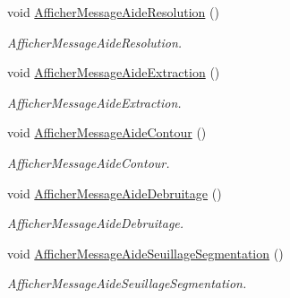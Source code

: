 \begin{DoxyCompactItemize}
\mbox{\label{classMainWindow_a739230f160f977f84bbd1aa6b8b3bed6}} 
void \hyperlink{classMainWindow_a739230f160f977f84bbd1aa6b8b3bed6}{Afficher\+Message\+Aide\+Resolution} ()
\begin{DoxyCompactList}\small\item\em Afficher\+Message\+Aide\+Resolution. \end{DoxyCompactList}\item 
\mbox{\label{classMainWindow_a0686a5e005ce5ad4c4bea3a6224b552d}} 
void \hyperlink{classMainWindow_a0686a5e005ce5ad4c4bea3a6224b552d}{Afficher\+Message\+Aide\+Extraction} ()
\begin{DoxyCompactList}\small\item\em Afficher\+Message\+Aide\+Extraction. \end{DoxyCompactList}\item 
\mbox{\label{classMainWindow_ac243627f25330122f272623cc1e87736}} 
void \hyperlink{classMainWindow_ac243627f25330122f272623cc1e87736}{Afficher\+Message\+Aide\+Contour} ()
\begin{DoxyCompactList}\small\item\em Afficher\+Message\+Aide\+Contour. \end{DoxyCompactList}\item 
\mbox{\label{classMainWindow_ab3fd048b197f1854d173268ec4de9741}} 
void \hyperlink{classMainWindow_ab3fd048b197f1854d173268ec4de9741}{Afficher\+Message\+Aide\+Debruitage} ()
\begin{DoxyCompactList}\small\item\em Afficher\+Message\+Aide\+Debruitage. \end{DoxyCompactList}\item 
\mbox{\label{classMainWindow_aae084a3e268d6651c65cebda3dae97ff}} 
void \hyperlink{classMainWindow_aae084a3e268d6651c65cebda3dae97ff}{Afficher\+Message\+Aide\+Seuillage\+Segmentation} ()
\begin{DoxyCompactList}\small\item\em Afficher\+Message\+Aide\+Seuillage\+Segmentation. \end{DoxyCompactList}\item 
\mbox{\label{classMainWindow_a848fc8dfd5998110e4e9ca090888d1d0}} 

\end{DoxyCompactItemize}
